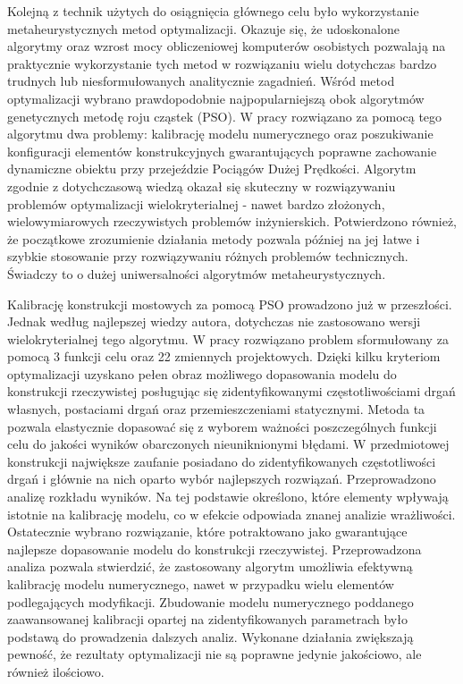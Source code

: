 Kolejną z technik użytych do osiągnięcia głównego celu było wykorzystanie metaheurystycznych metod optymalizacji. Okazuje się, że udoskonalone algorytmy oraz wzrost mocy obliczeniowej komputerów osobistych pozwalają na praktycznie wykorzystanie tych metod w rozwiązaniu wielu dotychczas bardzo trudnych lub niesformułowanych analitycznie zagadnień. Wśród metod optymalizacji wybrano prawdopodobnie najpopularniejszą obok algorytmów genetycznych metodę roju cząstek (PSO). W pracy rozwiązano za pomocą tego algorytmu dwa problemy: kalibrację modelu numerycznego oraz poszukiwanie konfiguracji elementów konstrukcyjnych gwarantujących poprawne zachowanie dynamiczne obiektu przy przejeździe Pociągów Dużej Prędkości. Algorytm zgodnie z dotychczasową wiedzą okazał się skuteczny w rozwiązywaniu problemów optymalizacji wielokryterialnej - nawet bardzo złożonych, wielowymiarowych rzeczywistych problemów inżynierskich. Potwierdzono również, że początkowe zrozumienie działania metody pozwala później na jej łatwe i szybkie stosowanie przy rozwiązywaniu różnych problemów technicznych. Świadczy to o dużej uniwersalności algorytmów metaheurystycznych.

Kalibrację konstrukcji mostowych za pomocą PSO prowadzono już w przeszłości. Jednak według najlepszej wiedzy autora, dotychczas nie zastosowano wersji wielokryterialnej tego algorytmu. W pracy rozwiązano problem sformułowany za pomocą 3 funkcji celu oraz 22 zmiennych projektowych. Dzięki kilku kryteriom optymalizacji uzyskano pełen obraz możliwego dopasowania modelu do konstrukcji rzeczywistej posługując się zidentyfikowanymi częstotliwościami drgań własnych, postaciami drgań oraz przemieszczeniami statycznymi. Metoda ta pozwala elastycznie dopasować się z wyborem ważności poszczególnych funkcji celu do jakości wyników obarczonych nieuniknionymi błędami. W przedmiotowej konstrukcji największe zaufanie posiadano do zidentyfikowanych częstotliwości drgań i głównie na nich oparto wybór najlepszych rozwiązań. Przeprowadzono analizę rozkładu wyników. Na tej podstawie określono, które elementy wpływają istotnie na kalibrację modelu, co w efekcie odpowiada znanej analizie wrażliwości. Ostatecznie wybrano rozwiązanie, które potraktowano jako gwarantujące najlepsze dopasowanie modelu do konstrukcji rzeczywistej. Przeprowadzona analiza pozwala stwierdzić, że zastosowany algorytm umożliwia efektywną kalibrację modelu numerycznego, nawet w przypadku wielu elementów podlegających modyfikacji. Zbudowanie modelu numerycznego poddanego zaawansowanej kalibracji opartej na zidentyfikowanych parametrach było podstawą do prowadzenia dalszych analiz. Wykonane działania zwiększają pewność, że rezultaty optymalizacji nie są poprawne jedynie jakościowo, ale również ilościowo. 

